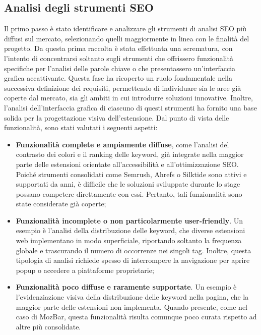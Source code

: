 \subsection{Analisi degli strumenti SEO}

\par Il primo passo è stato identificare e analizzare gli strumenti di analisi SEO più diffusi sul mercato, selezionando quelli maggiormente in linea con le finalità del progetto. Da questa prima raccolta è stata effettuata una scrematura, con l’intento di concentrarsi soltanto sugli strumenti che offrissero funzionalità specifiche per l’analisi delle parole chiave o che presentassero un’interfaccia grafica accattivante. Questa fase ha ricoperto un ruolo fondamentale nella successiva definizione dei requisiti, permettendo di individuare sia le aree già coperte dal mercato, sia gli ambiti in cui introdurre soluzioni innovative. Inoltre, l’analisi dell’interfaccia grafica di ciascuno di questi strumenti ha fornito una base solida per la progettazione visiva dell’estensione. Dal punto di vista delle funzionalità, sono stati valutati i seguenti aspetti:

\begin{itemize}
  \item \textbf{Funzionalità complete e ampiamente diffuse}, come l’analisi del contrasto dei colori e il ranking delle keyword, già integrate nella maggior parte delle estensioni orientate all’accessibilità e all’ottimizzazione SEO. Poiché strumenti consolidati come Semrush, Ahrefs o Silktide sono attivi e supportati da anni, è difficile che le soluzioni sviluppate durante lo stage possano competere direttamente con essi. Pertanto, tali funzionalità sono state considerate già coperte;
  \item \textbf{Funzionalità incomplete o non particolarmente user-friendly}. Un esempio è l’analisi della distribuzione delle keyword, che diverse estensioni web implementano in modo superficiale, riportando soltanto la frequenza globale e trascurando il numero di occorrenze nei singoli tag. Inoltre, questa tipologia di analisi richiede spesso di interrompere la navigazione per aprire popup o accedere a piattaforme proprietarie;
  \item \textbf{Funzionalità poco diffuse e raramente supportate}. Un esempio è l’evidenziazione visiva della distribuzione delle keyword nella pagina, che la maggior parte delle estensioni non implementa. Quando presente, come nel caso di MozBar, questa funzionalità risulta comunque poco curata rispetto ad altre più consolidate.
\end{itemize}

